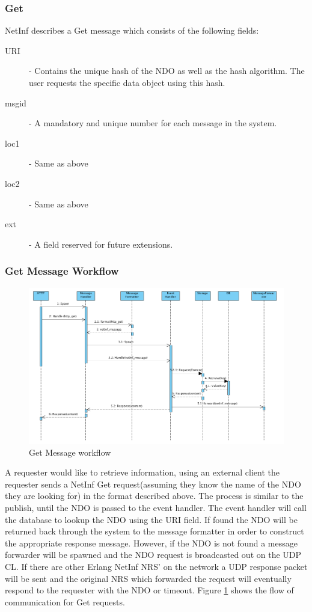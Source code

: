 \subsubsection{Get}

NetInf describes a Get message which consists of the following fields:

\begin{description}
\item[URI] - Contains the unique hash of the NDO as well as the hash algorithm. The user requests the specific data object using this hash.
\item[msgid]- A mandatory and unique number for each message in the system.
\item[loc1] - Same as above
\item[loc2] - Same as above
\item[ext]  - A field reserved for future extensions.
\end{description}

\subsubsection{Get Message Workflow}

\begin{figure}[H]
	\centering
\centerline{\includegraphics[width=1.2\textwidth]{./img/backend_seq_diagram_GET.png}}
\caption{Get Message workflow}
\label{fig:getfig}
\end{figure}

A requester would like to retrieve information, using an external client the requester sends a NetInf Get request(assuming they know the name of the NDO they are looking for) in the format described above. The process is similar to the publish, until the NDO is passed to the event handler. The event handler will call the database to lookup the NDO using the URI field. If found the NDO will be returned back through the system to the message formatter in order to construct the appropriate response message. However, if the NDO is not found a message forwarder will be spawned and the NDO request is broadcasted out on the UDP CL. If there are other Erlang NetInf NRS' on the network a UDP response packet will be sent and the original NRS which forwarded the request will eventually respond to the requester with the NDO or timeout. Figure \ref{fig:getfig} shows the flow of communication for Get requests.

